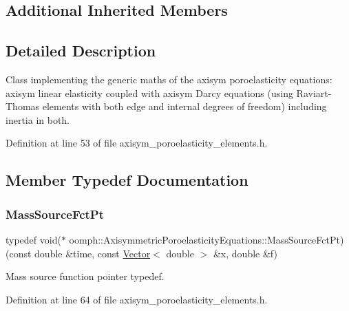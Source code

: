 \subsection*{Additional Inherited Members}


\subsection{Detailed Description}
Class implementing the generic maths of the axisym poroelasticity equations\+: axisym linear elasticity coupled with axisym Darcy equations (using Raviart-\/\+Thomas elements with both edge and internal degrees of freedom) including inertia in both. 

Definition at line 53 of file axisym\+\_\+poroelasticity\+\_\+elements.\+h.



\subsection{Member Typedef Documentation}
\mbox{\label{classoomph_1_1AxisymmetricPoroelasticityEquations_a4f2fe2e03df9328898e9932b09299655}} 
\subsubsection{\texorpdfstring{Mass\+Source\+Fct\+Pt}{MassSourceFctPt}}
{\footnotesize\ttfamily typedef void($\ast$ oomph\+::\+Axisymmetric\+Poroelasticity\+Equations\+::\+Mass\+Source\+Fct\+Pt) (const double \&time, const \hyperlink{classoomph_1_1Vector}{Vector}$<$ double $>$ \&x, double \&f)}



Mass source function pointer typedef. 



Definition at line 64 of file axisym\+\_\+poroelasticity\+\_\+elements.\+h.

\mbox{\label{classoomph_1_1AxisymmetricPoroelasticityEquations_a7a2c87557c3d9d405bb07a9f53bb4abe}} 
